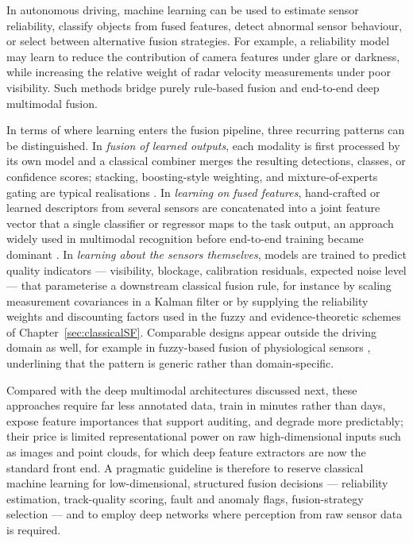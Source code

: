 \documentclass[11pt,oneside,openany]{book}
\newcommand{\addednew}[1]{\textcolor{RevisionOlive}{#1}}
\begin{document}
In autonomous driving, machine learning can be used to estimate sensor reliability, classify objects from fused features, detect abnormal sensor behaviour, or select between alternative fusion strategies. For example, a reliability model may learn to reduce the contribution of camera features under glare or darkness, while increasing the relative weight of radar velocity measurements under poor visibility. Such methods bridge purely rule-based fusion and end-to-end deep multimodal fusion.

\addednew{In terms of where learning enters the fusion pipeline, three recurring patterns can be distinguished. In \emph{fusion of learned outputs}, each modality is first processed by its own model and a classical combiner merges the resulting detections, classes, or confidence scores; stacking, boosting-style weighting, and mixture-of-experts gating are typical realisations \cite{breiman2001_rf,khaleghi_multisensor_2013}. In \emph{learning on fused features}, hand-crafted or learned descriptors from several sensors are concatenated into a joint feature vector that a single classifier or regressor maps to the task output, an approach widely used in multimodal recognition before end-to-end training became dominant \cite{atrey_multimodal_2010,gao_survey_2020}. In \emph{learning about the sensors themselves}, models are trained to predict quality indicators --- visibility, blockage, calibration residuals, expected noise level --- that parameterise a downstream classical fusion rule, for instance by scaling measurement covariances in a Kalman filter or by supplying the reliability weights and discounting factors used in the fuzzy and evidence-theoretic schemes of Chapter~\ref{sec:classicalSF}. Comparable designs appear outside the driving domain as well, for example in fuzzy-based fusion of physiological sensors \cite{testa_fuzzyfusion_2025}, underlining that the pattern is generic rather than domain-specific.}

\addednew{Compared with the deep multimodal architectures discussed next, these approaches require far less annotated data, train in minutes rather than days, expose feature importances that support auditing, and degrade more predictably; their price is limited representational power on raw high-dimensional inputs such as images and point clouds, for which deep feature extractors \cite{guo_deep_2019} are now the standard front end. A pragmatic guideline is therefore to reserve classical machine learning for low-dimensional, structured fusion decisions --- reliability estimation, track-quality scoring, fault and anomaly flags, fusion-strategy selection --- and to employ deep networks where perception from raw sensor data is required.}
\end{document}
